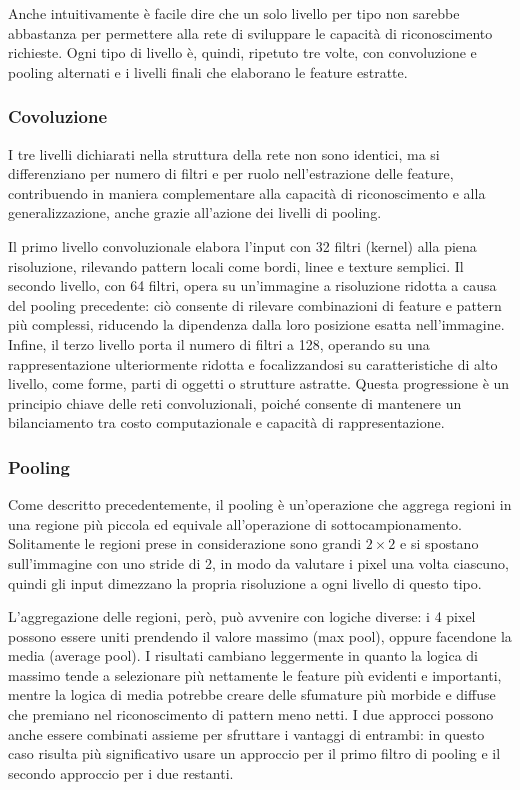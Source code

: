 \documentclass[a4paper,12pt]{article}
\begin{document}
Anche intuitivamente è facile dire che un solo livello per tipo non sarebbe abbastanza per permettere alla rete di sviluppare le capacità di riconoscimento richieste. Ogni tipo di livello è, quindi, ripetuto tre volte, con convoluzione e pooling alternati e i livelli finali che elaborano le feature estratte.

\subsubsection{Covoluzione}
I tre livelli dichiarati nella struttura della rete non sono identici, ma si differenziano per numero di filtri e per ruolo nell'estrazione delle feature, contribuendo in maniera complementare alla capacità di riconoscimento e alla generalizzazione, anche grazie all'azione dei livelli di pooling.

Il primo livello convoluzionale elabora l'input con 32 filtri (kernel) alla piena risoluzione, rilevando pattern locali come bordi, linee e texture semplici.
Il secondo livello, con 64 filtri, opera su un'immagine a risoluzione ridotta a causa del pooling precedente: ciò consente di rilevare combinazioni di feature e pattern più complessi, riducendo la dipendenza dalla loro posizione esatta nell'immagine.
Infine, il terzo livello porta il numero di filtri a 128, operando su una rappresentazione ulteriormente ridotta e focalizzandosi su caratteristiche di alto livello, come forme, parti di oggetti o strutture astratte.
Questa progressione è un principio chiave delle reti convoluzionali, poiché consente di mantenere un bilanciamento tra costo computazionale e capacità di rappresentazione.

\subsubsection{Pooling}
Come descritto precedentemente, il pooling è un'operazione che aggrega regioni in una regione più piccola ed equivale all'operazione di sottocampionamento. Solitamente le regioni prese in considerazione sono grandi $2 \times 2$ e si spostano sull'immagine con uno stride di 2, in modo da valutare i pixel una volta ciascuno, quindi gli input dimezzano la propria risoluzione a ogni livello di questo tipo.

L'aggregazione delle regioni, però, può avvenire con logiche diverse: i 4 pixel possono essere uniti prendendo il valore massimo (max pool), oppure facendone la media (average pool). I risultati cambiano leggermente in quanto la logica di massimo tende a selezionare più nettamente le feature più evidenti e importanti, mentre la logica di media potrebbe creare delle sfumature più morbide e diffuse che premiano nel riconoscimento di pattern meno netti.
I due approcci possono anche essere combinati assieme per sfruttare i vantaggi di entrambi: in questo caso risulta più significativo usare un approccio per il primo filtro di pooling e il secondo approccio per i due restanti.
\end{document}
